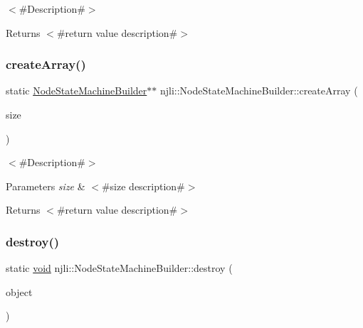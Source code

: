 $<$\#\+Description\#$>$

\begin{DoxyReturn}{Returns}
$<$\#return value description\#$>$ 
\end{DoxyReturn}
\mbox{\label{classnjli_1_1_node_state_machine_builder_a87e85ebebdf78aa50dcc33397ee3274a}} 
\subsubsection{\texorpdfstring{create\+Array()}{createArray()}}
{\footnotesize\ttfamily static \mbox{\hyperlink{classnjli_1_1_node_state_machine_builder}{Node\+State\+Machine\+Builder}}$\ast$$\ast$ njli\+::\+Node\+State\+Machine\+Builder\+::create\+Array (\begin{DoxyParamCaption}\item[{const \mbox{\hyperlink{_util_8h_a10e94b422ef0c20dcdec20d31a1f5049}{u32}}}]{size }\end{DoxyParamCaption})\hspace{0.3cm}{\ttfamily [static]}}

$<$\#\+Description\#$>$


\begin{DoxyParams}{Parameters}
{\em size} & $<$\#size description\#$>$\\
\hline
\end{DoxyParams}
\begin{DoxyReturn}{Returns}
$<$\#return value description\#$>$ 
\end{DoxyReturn}
\mbox{\label{classnjli_1_1_node_state_machine_builder_aee8753fc57fd57568e1c5aff1e638fac}} 
\subsubsection{\texorpdfstring{destroy()}{destroy()}}
{\footnotesize\ttfamily static \mbox{\hyperlink{_thread_8h_af1e856da2e658414cb2456cb6f7ebc66}{void}} njli\+::\+Node\+State\+Machine\+Builder\+::destroy (\begin{DoxyParamCaption}\item[{\mbox{\hyperlink{classnjli_1_1_node_state_machine_builder}{Node\+State\+Machine\+Builder}} $\ast$}]{object }\end{DoxyParamCaption})\hspace{0.3cm}{\ttfamily [static]}}


